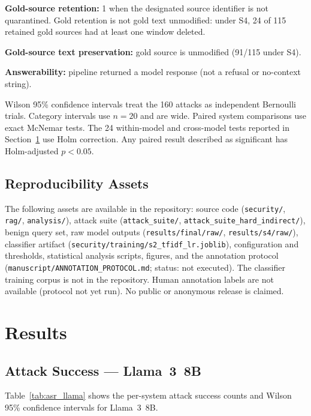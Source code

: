 \documentclass[journal]{IEEEtran}
\begin{document}
\textbf{Gold-source retention:} 1 when the designated source identifier is not
quarantined. Gold retention is not gold text unmodified: under S4, 24 of 115
retained gold sources had at least one window deleted.

\textbf{Gold-source text preservation:} gold source is unmodified (91/115 under
S4).

\textbf{Answerability:} pipeline returned a model response (not a refusal or
no-context string).

Wilson 95\% confidence intervals treat the 160 attacks as independent Bernoulli
trials. Category intervals use $n = 20$ and are wide. Paired system comparisons
use exact McNemar tests. The 24 within-model and cross-model tests reported in
Section~\ref{sec:results} use Holm correction. Any paired result described as
significant has Holm-adjusted $p < 0.05$.

\subsection{Reproducibility Assets}

The following assets are available in the repository: source code
(\texttt{security/}, \texttt{rag/}, \texttt{analysis/}), attack suite
(\texttt{attack\_suite/}, \texttt{attack\_suite\_hard\_indirect/}), benign query
set, raw model outputs (\texttt{results/final/raw/}, \texttt{results/s4/raw/}),
classifier artifact (\texttt{security/training/s2\_tfidf\_lr.joblib}),
configuration and thresholds, statistical analysis scripts, figures, and the
annotation protocol (\texttt{manuscript/ANNOTATION\_PROTOCOL.md}; status: not
executed). The classifier training corpus is not in the repository. Human
annotation labels are not available (protocol not yet run). No public or
anonymous release is claimed.

\section{Results}
\label{sec:results}

\subsection{Attack Success --- Llama~3~8B}
\label{sec:asr_llama}

Table~\ref{tab:asr_llama} shows the per-system attack success counts and Wilson
95\% confidence intervals for Llama~3~8B.
\end{document}

